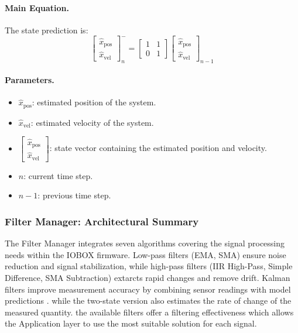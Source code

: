 \paragraph{Main Equation.}
The state prediction is:
\begin{equation}
    \begin{bmatrix} \hat{x}_{\text{pos}} \\ \hat{x}_{\text{vel}} \end{bmatrix}_{n}^{-}
    =
    \begin{bmatrix} 1 & 1 \\ 0 & 1 \end{bmatrix}
    \begin{bmatrix} \hat{x}_{\text{pos}} \\ \hat{x}_{\text{vel}} \end{bmatrix}_{n-1}
    \label{eq:kalman2_predict}
\end{equation}

\paragraph{Parameters.}
\begin{itemize}
    \item $\hat{x}_{\text{pos}}$: estimated position of the system.
    \item $\hat{x}_{\text{vel}}$: estimated velocity of the system.
    \item $\begin{bmatrix} \hat{x}_{\text{pos}} \\ \hat{x}_{\text{vel}} \end{bmatrix}$: state vector containing the estimated position and velocity.
    \item $n$: current time step.
    \item $n-1$: previous time step.

\end{itemize}


\subsubsection{Filter Manager: Architectural Summary}
The Filter Manager integrates seven algorithms covering the  
signal processing needs within the IOBOX firmware. Low-pass filters (EMA, SMA) 
ensure noise reduction and signal stabilization, while high-pass filters (IIR 
High-Pass, Simple Difference, SMA Subtraction) extarcts rapid changes and remove 
drift. Kalman filters improve measurement accuracy by combining sensor readings with model predictions .
while the two-state version also estimates the rate of change of the measured quantity.
the available filters offer a filtering effectiveness which allows the Application layer to use the most suitable solution for each signal.

